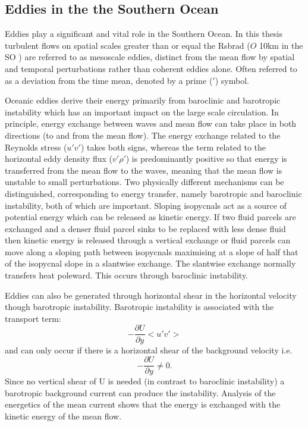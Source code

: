\subsection{Eddies in the the Southern Ocean}

Eddies play a significant and vital role in the Southern Ocean. In this thesis turbulent flows on spatial scales greater than or equal the \gls{Rsbrad} ($O$ 10km in the SO ) are referred to as mesoscale eddies, distinct from the mean flow by spatial and temporal perturbations rather than coherent eddies alone. Often referred to as a deviation from the time mean, denoted by a prime ($'$) symbol.

Oceanic eddies derive their energy primarily from baroclinic and barotropic instability which has an important impact on the large scale circulation. In principle, energy exchange between waves and mean flow can take place in both directions (to and from the mean flow).
The energy exchange related to the Reynolds stress ($u'v'$) takes both signs, whereas the term related to the horizontal eddy density flux ($v'\rho '$) is predominantly positive so that energy is transferred from the mean flow to the waves, meaning that the mean flow is unstable to small perturbations. Two physically different mechanisms can be distinguished, corresponding to energy transfer, namely barotropic and baroclinic instability, both of which are important.
Sloping isopycnals act as a source of potential energy which can be released as kinetic energy. If two fluid parcels are exchanged and a denser fluid parcel sinks to be replaced with less dense fluid then kinetic energy is released through a vertical exchange or fluid parcels can move along a sloping path between isopycnals maximising at a slope of half that of the isopycnal slope in a slantwise exchange. The slantwise exchange normally transfers heat poleward. This occurs through baroclinic instability. 

Eddies can also be generated through horizontal shear in the horizontal velocity though barotropic instability. Barotropic instability is associated with the transport term: $$ -\frac{\partial U}{\partial y} <u'v'> $$ and can only occur if there is a horizontal shear of the background velocity i.e. \begin{equation*}
 -\frac{\partial U}{\partial y}  \neq 0 . 
\end{equation*} Since no vertical shear of U is needed (in contrast to baroclinic instability) a barotropic background current can produce the instability. Analysis of the energetics of the mean current shows that the energy is exchanged with the kinetic energy of the mean flow.

